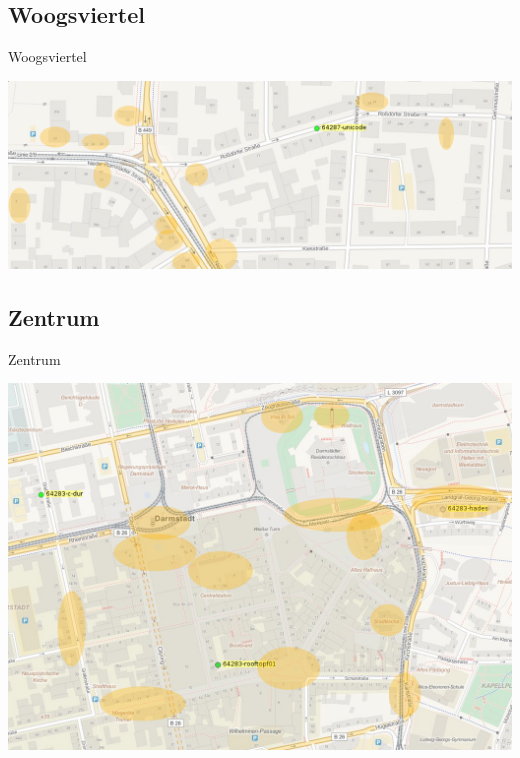 \documentclass{beamer}
\begin{document}
\subsection{Woogsviertel}
\begin{frame}{Woogsviertel}
\begin{center}
\includegraphics[width=\textwidth]{woogsviertel2}
\end{center}
\end{frame}

\subsection{Zentrum}
\begin{frame}{Zentrum}
\begin{center}
\includegraphics[height=0.8\textheight]{zentrum2}
\end{center}
\end{frame}
\end{document}
